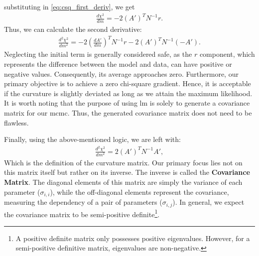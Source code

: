 \documentclass[12pt, TexShade, letterpaper]{report}
\begin{document}
substituting in \ref{eq:csq_first_deriv}, we get
\begin{align}
    \frac{d \chi^2}{dm} = -2 \left(A'\right)^T N^{-1} r.
\end{align}
Thus, we can calculate the second derivative:
\begin{align}
    \frac{d^2 \chi^2}{dm^2} = -2 \left(\frac{dA'}{dm}\right)^T N^{-1} r -2 \left(A'\right) ^T N^{-1} \left(-A'\right).
\end{align}
Neglecting the initial term is generally considered safe, as the $r$ component, which represents the difference between the model and data, can have positive or negative values. Consequently, its average approaches zero. Furthermore, our primary objective is to achieve a zero chi-square gradient. Hence, it is acceptable if the curvature is slightly deviated as long as we attain the maximum likelihood. It is worth noting that the purpose of using \gls{lm} is solely to generate a covariance matrix for our \gls{mcmc}. Thus, the generated covariance matrix does not need to be flawless.

Finally, using the above-mentioned logic, we are left with:
\begin{align}
         \frac{d^2 \chi^2}{dm^2} = 2 \left(A'\right)^T N^{-1} A' ,\label{eq:csq_second_deriv}
\end{align}
Which is the definition of the curvature matrix. Our primary focus lies not on this matrix itself but rather on its inverse. The inverse is called the \textbf{Covariance Matrix}. The diagonal elements of this matrix are simply the variance of each parameter ($\sigma_{i, i}$), while the off-diagonal elements represent the covariance, measuring the dependency of a pair of parameters ($\sigma_{i, j}$). In general, we expect the covariance matrix to be semi-positive definite\footnote{A positive definite matrix only possesses positive eigenvalues. However, for a semi-positive definitive matrix, eigenvalues are non-negative.}.\par
\end{document}
